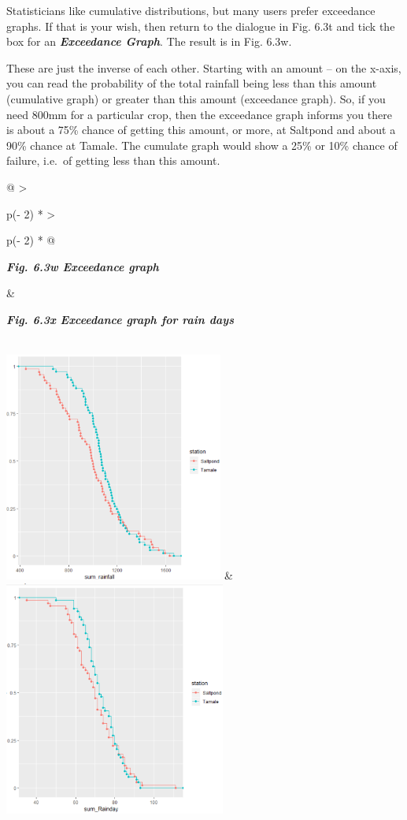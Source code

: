 \documentclass[
  letterpaper,
  DIV=11,
  numbers=noendperiod]{scrreprt}
\begin{document}
Statisticians like cumulative distributions, but many users prefer
exceedance graphs. If that is your wish, then return to the dialogue in
Fig. 6.3t and tick the box for an \textbf{\emph{Exceedance Graph}}. The
result is in Fig. 6.3w.

These are just the inverse of each other. Starting with an amount -- on
the x-axis, you can read the probability of the total rainfall being
less than this amount (cumulative graph) or greater than this amount
(exceedance graph). So, if you need 800mm for a particular crop, then
the exceedance graph informs you there is about a 75\% chance of getting
this amount, or more, at Saltpond and about a 90\% chance at Tamale. The
cumulate graph would show a 25\% or 10\% chance of failure, i.e.~of
getting less than this amount.

\begin{longtable}[]{@{}
  >{\raggedright\arraybackslash}p{(\columnwidth - 2\tabcolsep) * }
  >{\raggedright\arraybackslash}p{(\columnwidth - 2\tabcolsep) * }@{}}
\toprule\noalign{}
\begin{minipage}[b]{\linewidth}\raggedright
\textbf{\emph{Fig. 6.3w Exceedance graph}}
\end{minipage} & \begin{minipage}[b]{\linewidth}\raggedright
\textbf{\emph{Fig. 6.3x Exceedance graph for rain days}}
\end{minipage} \\
\midrule\noalign{}
\endhead
\bottomrule\noalign{}
\endlastfoot
\includegraphics[width=2.83659in,height=2.97992in]{figures/Fig6.3w.png}
&
\includegraphics[width=2.86216in,height=3.04293in]{figures/Fig6.3x.png} \\
\end{longtable}
\end{document}
